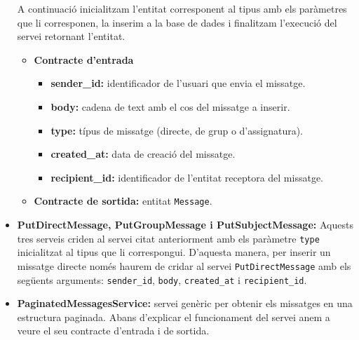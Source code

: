 \begin{itemize}
			A continuació inicialitzam l'entitat corresponent al tipus amb els paràmetres que li corresponen, la inserim a la base de dades i finalitzam l'execució del servei retornant l'entitat.
			
				\begin{itemize}
					\item \textbf{Contracte d'entrada}
						\begin{itemize}
							\item \textbf{sender\_id:} identificador de l'usuari que envia el missatge.
							\item \textbf{body:} cadena de text amb el cos del missatge a inserir.
							\item \textbf{type:} típus de missatge (directe, de grup o d'assignatura).
							\item \textbf{created\_at:} data de creació del missatge.
							\item \textbf{recipient\_id:} identificador de l'entitat receptora del missatge.
						\end{itemize}
					\item \textbf{Contracte de sortida:} entitat \texttt{Message}.
			\end{itemize}
			
			
			
			\item \textbf{PutDirectMessage, PutGroupMessage i PutSubjectMessage:} Aquests tres serveis criden al servei citat anteriorment amb els paràmetre \texttt{type} inicialitzat al tipus que li correspongui. D'aquesta manera, per inserir un missatge directe només haurem de cridar al servei \texttt{PutDirectMessage} amb els següents arguments: \texttt{sender\_id}, \texttt{body}, \texttt{created\_at} i \texttt{recipient\_id}.
				
			\item \textbf{PaginatedMessagesService:} servei genèric per obtenir els missatges en una estructura paginada.  Abans d'explicar el funcionament del servei anem a veure el seu contracte d'entrada i de sortida.
			

\end{itemize}
